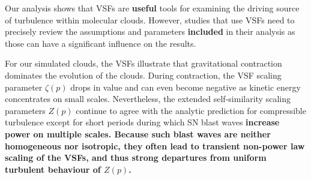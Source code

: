 Our analysis shows that VSFs are \textbf{useful} tools for examining the driving source of turbulence within molecular clouds.
However, studies that use VSFs need to precisely review the assumptions and parameters \textbf{included} in their analysis as those can have a significant influence on the results.

For our simulated clouds, the VSFs illustrate that gravitational contraction dominates the evolution of the clouds.
During contraction, the VSF scaling parameter $\zeta(p)$ drops in value and can even become negative as kinetic energy concentrates on small scales.
Nevertheless, the extended self-similarity scaling parameters $Z(p)$ continue to agree with the analytic prediction for compressible turbulence except for short periods during which SN blast waves \textbf{increase power on multiple scales.
Because such blast waves are neither homogeneous nor isotropic, they often lead to transient non-power law scaling of the VSFs, and thus strong departures from uniform turbulent behaviour of $Z(p)$.} 



\endinput
